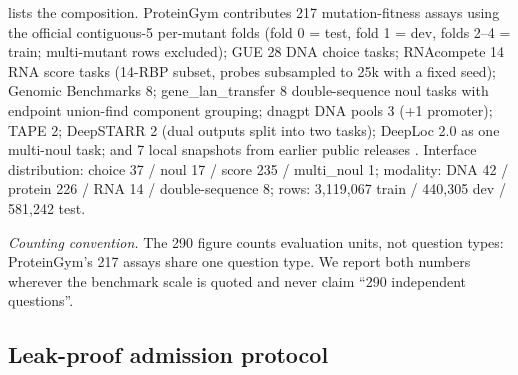 lists the composition. ProteinGym contributes 217 mutation-fitness
assays using the official contiguous-5 per-mutant folds (fold 0 = test, fold 1 = dev,
folds 2--4 = train; multi-mutant rows excluded); GUE 28 DNA choice tasks; RNAcompete 14
RNA score tasks (14-RBP subset, probes subsampled to 25k with a fixed seed); Genomic
Benchmarks 8; gene\_lan\_transfer 8 double-sequence noul tasks with endpoint
union-find component grouping; dnagpt DNA pools 3 (+1 promoter); TAPE 2; DeepSTARR 2
(dual outputs split into two tasks); DeepLoc 2.0 as one multi-noul task; and 7 local
snapshots from earlier public releases \citep{wang2024llamagene,wang2026biopaws}. Interface
distribution: choice 37 / noul 17 / score 235 / multi\_noul 1; modality: DNA 42 / protein
226 / RNA 14 / double-sequence 8; rows: 3{,}119{,}067 train / 440{,}305 dev /
581{,}242 test.

\emph{Counting convention.} The 290 figure counts evaluation units, not question types:
ProteinGym's 217 assays share one question type. We report both numbers wherever the
benchmark scale is quoted and never claim ``290 independent questions''.



\subsection{Leak-proof admission protocol}
\label{sec:admission}

